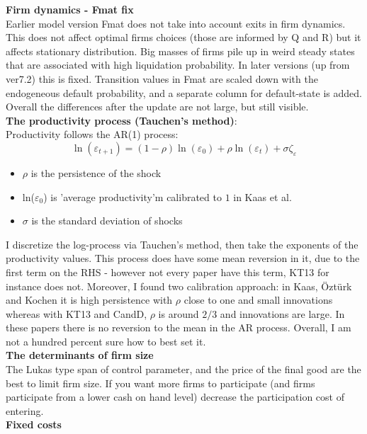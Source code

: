 \documentclass[12pt]{article}
\begin{document}
\textbf{Firm dynamics - Fmat fix} \\ 
Earlier model version Fmat does not take into account exits in firm dynamics. This does not affect optimal firms choices (those are informed by Q and R) but it affects stationary distribution. Big masses of firms pile up in weird steady states that are associated with high liquidation probability. In later versions (up from ver7.2) this is fixed. Transition values in Fmat are scaled down with the endogeneous default probability, and a separate column for default-state is added. Overall the differences after the update are not large, but still visible. \vspace{3mm} \\
\textbf{The productivity process (Tauchen's method)}: \\
Productivity follows the AR(1) process:
$$ \ln(\varepsilon_{t+1}) = (1-\rho) \ln(\varepsilon_0) + \rho \ln(\varepsilon_t) + \sigma \zeta_\varepsilon $$
\begin{itemize}\setlength\itemsep{0em} \small
    \item $\rho$ is the persistence of the shock
    \item ln($\varepsilon_0$) is 'average productivity'm calibrated to $1$ in Kaas et al.
    \item $\sigma$ is the standard deviation of shocks
\end{itemize} \normalsize
I discretize the log-process via Tauchen's method, then take the exponents of the productivity values. This process does have some mean reversion in it, due to the first term on the RHS - however not every paper have this term, KT13 for instance does not. Moreover, I found two calibration approach: in Kaas, Öztürk and Kochen it is high persistence with $\rho$ close to one and small innovations whereas with KT13 and CandD, $\rho$ is around $2/3$ and innovations are large. In these papers there is no reversion to the mean in the AR process. Overall, I am not a hundred percent sure how to best set it.  \vspace{3mm} \\
\textbf{The determinants of firm size} \\
 The Lukas type span of control parameter, and the price of the final good are the best to limit firm size. If you want more firms to participate (and firms participate from a lower cash on hand level) decrease the participation cost of entering. \vspace{3mm} \\
\textbf{Fixed costs} \\
\end{document}
